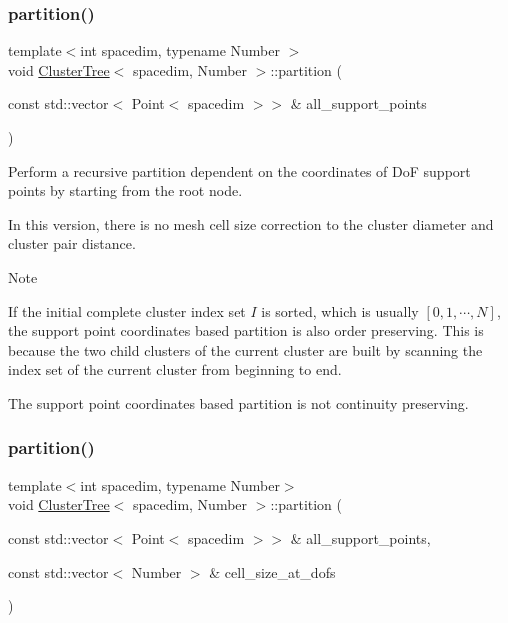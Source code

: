 \mbox{\label{classClusterTree_a5657415b4b0519f045f3139d1d63e85d}} 
\subsubsection{\texorpdfstring{partition()}{partition()}\hspace{0.1cm}{\footnotesize\ttfamily [2/3]}}
{\footnotesize\ttfamily template$<$int spacedim, typename Number $>$ \\
void \hyperlink{classClusterTree}{Cluster\+Tree}$<$ spacedim, Number $>$\+::partition (\begin{DoxyParamCaption}\item[{const std\+::vector$<$ Point$<$ spacedim $>$$>$ \&}]{all\+\_\+support\+\_\+points }\end{DoxyParamCaption})}

Perform a recursive partition dependent on the coordinates of DoF support points by starting from the root node.

In this version, there is no mesh cell size correction to the cluster diameter and cluster pair distance.


\begin{DoxyDescription}
\item[Note ]
\begin{DoxyEnumerate}
\item If the initial complete cluster index set $I$ is sorted, which is usually $[0, 1, \cdots, N]$, the support point coordinates based partition is also order preserving. This is because the two child clusters of the current cluster are built by scanning the index set of the current cluster from beginning to end.
\item The support point coordinates based partition is not continuity preserving.  
\end{DoxyEnumerate}
\end{DoxyDescription}\mbox{\label{classClusterTree_a4d2682986352bb1e44bc73ebfc5a9fdf}} 
\subsubsection{\texorpdfstring{partition()}{partition()}\hspace{0.1cm}{\footnotesize\ttfamily [3/3]}}
{\footnotesize\ttfamily template$<$int spacedim, typename Number$>$ \\
void \hyperlink{classClusterTree}{Cluster\+Tree}$<$ spacedim, Number $>$\+::partition (\begin{DoxyParamCaption}\item[{const std\+::vector$<$ Point$<$ spacedim $>$$>$ \&}]{all\+\_\+support\+\_\+points,  }\item[{const std\+::vector$<$ Number $>$ \&}]{cell\+\_\+size\+\_\+at\+\_\+dofs }\end{DoxyParamCaption})}

